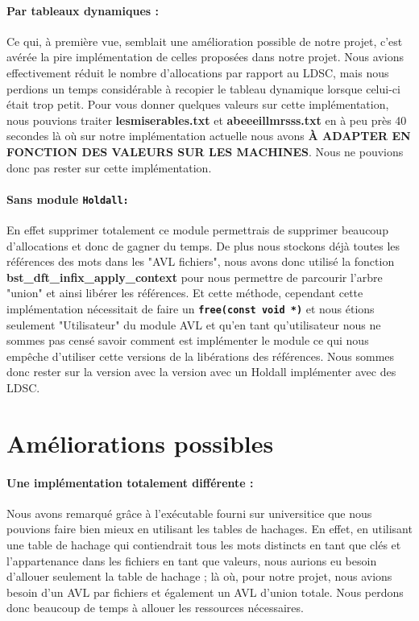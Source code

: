 \documentclass{article}
\begin{document}
\paragraph{Par tableaux dynamiques :} Ce qui, à première vue, semblait une amélioration possible de notre projet, c'est avérée la pire implémentation de
celles proposées dans notre projet. Nous avions effectivement réduit le nombre d'allocations par rapport au LDSC, mais nous perdions un temps considérable
à recopier le tableau dynamique lorsque celui-ci était trop petit. Pour vous donner quelques valeurs sur cette implémentation, nous pouvions traiter \textbf{lesmiserables.txt}
et \textbf{abeeeillmrsss.txt} en à peu près 40 secondes là où sur notre implémentation actuelle nous avons \textbf{À ADAPTER EN FONCTION DES VALEURS SUR LES MACHINES}.
Nous ne pouvions donc pas rester sur cette implémentation.

\paragraph{Sans module \texttt{Holdall:}} En effet supprimer totalement ce module permettrais de supprimer beaucoup d'allocations et donc de gagner du temps.
De plus nous stockons déjà toutes les références des mots dans les "AVL fichiers", nous avons donc utilisé la fonction \textbf{bst\_dft\_infix\_apply\_context}
pour nous permettre de parcourir l'arbre "union" et ainsi libérer les références. Et cette méthode, cependant cette implémentation nécessitait de faire un 
\texttt{\textbf{free(const void *)}} et nous étions seulement "Utilisateur" du module AVL et qu'en tant qu'utilisateur nous ne sommes pas censé savoir comment 
est implémenter le module ce qui nous empêche d'utiliser cette versions de la libérations des références. Nous sommes donc rester sur la version avec la version avec
un Holdall implémenter avec des LDSC.

\section{Améliorations possibles}

\paragraph{Une implémentation totalement différente :} Nous avons remarqué grâce à l'exécutable fourni sur universitice 
que nous pouvions faire bien mieux en utilisant les tables de hachages. En effet, en utilisant une table de hachage qui contiendrait
tous les mots distincts en tant que clés et l'appartenance dans les fichiers en tant que valeurs, nous aurions eu besoin d'allouer 
seulement la table de hachage ; là où, pour notre projet, nous avions besoin d'un AVL par fichiers et également un AVL d'union totale. 
Nous perdons donc beaucoup de temps à allouer les ressources nécessaires. 
\end{document}
